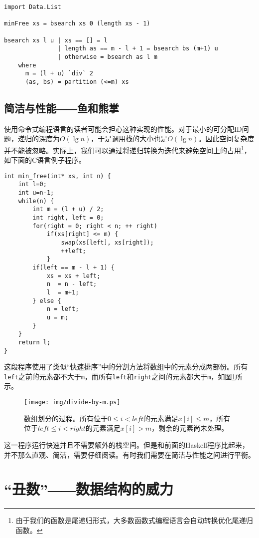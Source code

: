 \documentclass[UTF8]{article}
\begin{document}
\begin{lstlisting}[style=Haskell]
import Data.List

minFree xs = bsearch xs 0 (length xs - 1)

bsearch xs l u | xs == [] = l
               | length as == m - l + 1 = bsearch bs (m+1) u
               | otherwise = bsearch as l m
    where
      m = (l + u) `div` 2
      (as, bs) = partition (<=m) xs
\end{lstlisting}
\lstset{}

\subsection{简洁与性能――鱼和熊掌}
使用命令式编程语言的读者可能会担心这种实现的性能。对于最小的可分配ID问题，递归的深度为$O(\lg n)$，于是调用栈的大小也是$O(\lg n)$。因此空间复杂度并不能被忽略。实际上，我们可以通过将递归转换为迭代来避免空间上的占用\footnote{由于我们的函数是尾递归形式，大多数函数式编程语言会自动转换优化尾递归函数。}，如下面的C语言例子程序。

\lstset{language=C}
\begin{lstlisting}
int min_free(int* xs, int n) {
    int l=0;
    int u=n-1;
    while(n) {
        int m = (l + u) / 2;
        int right, left = 0;
        for(right = 0; right < n; ++ right)
            if(xs[right] <= m) {
                swap(xs[left], xs[right]);
                ++left;
            }
        if(left == m - l + 1) {
            xs = xs + left;
            n  = n - left;
            l  = m+1;
        } else {
            n = left;
            u = m;
        }
    }
    return l;
}
\end{lstlisting}

这段程序使用了类似“快速排序”中的分割方法将数组中的元素分成两部份。所有\texttt{left}之前的元素都不大于\texttt{m}，而所有\texttt{left}和\texttt{right}之间的元素都大于\texttt{m}，如图\ref{fig:divide}所示。

\begin{figure}[htbp]
  \centering
  \texttt{[image: img/divide-by-m.ps]}
  \caption{数组划分的过程。所有位于$0 \leq i < left$的元素满足$x[i] \leq m$，所有位于$left \leq i < right$的元素满足$x[i] > m$，剩余的元素尚未处理。} \label{fig:divide}
\end{figure}

这一程序运行快速并且不需要额外的栈空间。但是和前面的Haskell程序比起来，并不那么直观、简洁，需要仔细阅读。有时我们需要在简洁与性能之间进行平衡。

\section{“丑数”――数据结构的威力}
\end{document}
